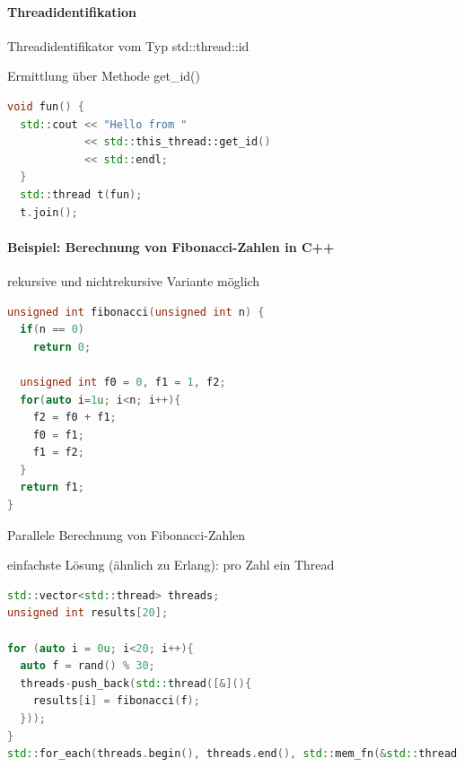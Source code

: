 \documentclass[10pt]{article}
\begin{document}
\paragraph{Threadidentifikation}

\begin{itemize*}
  \item Threadidentifikator vom Typ std::thread::id
  \item Ermittlung über Methode get\_id()
\end{itemize*}
\begin{lstlisting}[language=C++]
  void fun() {
  std::cout << "Hello from "
            << std::this_thread::get_id()
            << std::endl;
  }
  std::thread t(fun);
  t.join();
  \end{lstlisting}

\paragraph{Beispiel: Berechnung von Fibonacci-Zahlen in C++}
\begin{itemize*}
  \item rekursive und nichtrekursive Variante möglich
\end{itemize*}
\begin{lstlisting}[language=C++]
unsigned int fibonacci(unsigned int n) {
  if(n == 0)
    return 0;

  unsigned int f0 = 0, f1 = 1, f2;
  for(auto i=1u; i<n; i++){
    f2 = f0 + f1;
    f0 = f1;
    f1 = f2;
  }
  return f1;
}
\end{lstlisting}

Parallele Berechnung von Fibonacci-Zahlen
\begin{itemize*}
  \item einfachste Lösung (ähnlich zu Erlang): pro Zahl ein Thread
\end{itemize*}
\begin{lstlisting}[language=C++]
std::vector<std::thread> threads;
unsigned int results[20];

for (auto i = 0u; i<20; i++){
  auto f = rand() % 30;
  threads-push_back(std::thread([&](){
    results[i] = fibonacci(f);
  }));
}
std::for_each(threads.begin(), threads.end(), std::mem_fn(&std::thread::join));
\end{lstlisting}
\end{document}
